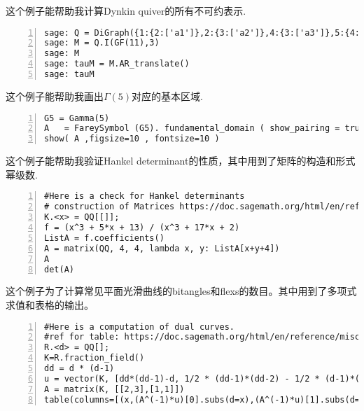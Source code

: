 \documentclass[11pt]{amsart}
\begin{document}
这个例子能帮助我计算Dynkin quiver的所有不可约表示.
\begin{lstlisting}[numbers=left,numberstyle=\tiny,numbersep=10pt]
sage: Q = DiGraph({1:{2:['a1']},2:{3:['a2']},4:{3:['a3']},5:{4:['a4']},6:{3:['a5']}}).path_semigroup()
sage: M = Q.I(GF(11),3)
sage: M
sage: tauM = M.AR_translate()
sage: tauM
\end{lstlisting}

这个例子能帮助我画出$\Gamma(5)$对应的基本区域.
\begin{lstlisting}[numbers=left,numberstyle=\tiny,numbersep=10pt]
G5 = Gamma(5)
A   = FareySymbol (G5). fundamental_domain ( show_pairing = true )
show( A ,figsize=10 , fontsize=10 )
\end{lstlisting}

这个例子能帮助我验证Hankel determinant的性质，其中用到了矩阵的构造和形式幂级数.
\begin{lstlisting}[numbers=left,numberstyle=\tiny,numbersep=10pt]
#Here is a check for Hankel determinants
# construction of Matrices https://doc.sagemath.org/html/en/reference/matrices/sage/matrix/constructor.html
K.<x> = QQ[[]]; 
f = (x^3 + 5*x + 13) / (x^3 + 17*x + 2)
ListA = f.coefficients()
A = matrix(QQ, 4, 4, lambda x, y: ListA[x+y+4])
A
det(A)
\end{lstlisting}

这个例子为了计算常见平面光滑曲线的bitangles和flexs的数目。其中用到了多项式求值和表格的输出。
\begin{lstlisting}[numbers=left,numberstyle=\tiny,numbersep=10pt]
#Here is a computation of dual curves.
#ref for table: https://doc.sagemath.org/html/en/reference/misc/sage/misc/table.html
R.<d> = QQ[]; 
K=R.fraction_field()
dd = d * (d-1)
u = vector(K, [dd*(dd-1)-d, 1/2 * (dd-1)*(dd-2) - 1/2 * (d-1)*(d-2)])
A = matrix(K, [[2,3],[1,1]])
table(columns=[(x,(A^(-1)*u)[0].subs(d=x),(A^(-1)*u)[1].subs(d=x)) for x in [2..9]], header_column=["$d$", "$b$", "$f$"], frame=True)
\end{lstlisting}
\end{document}
